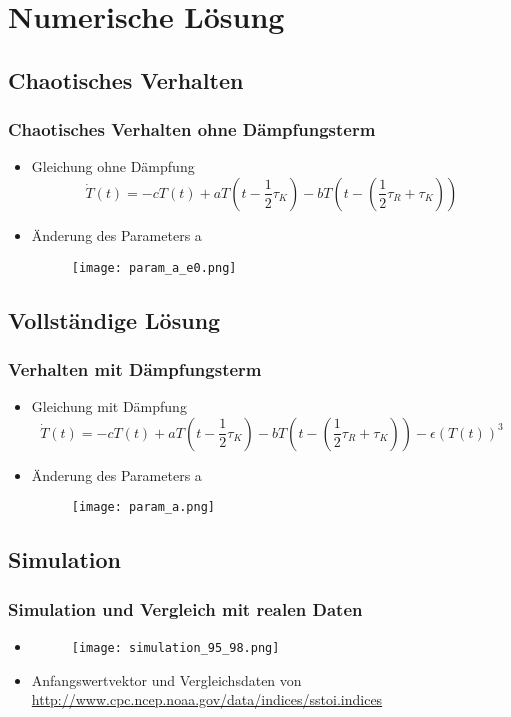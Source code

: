 \documentclass{beamer}
\begin{document}
\section{Numerische Lösung}

\subsection{Chaotisches Verhalten}
\begin{frame}
	\frametitle{Chaotisches Verhalten ohne Dämpfungsterm}
	\begin{itemize}
		\item[] Gleichung ohne Dämpfung
			\begin{equation}
				\dot{T}(t)=-cT(t)+aT(t-\frac{1}{2}\tau_K)-bT(t-(\frac{1}{2}\tau_R+\tau_K))
			\end{equation}
			\pause
		\item[] Änderung des Parameters a
			\begin{figure}
				\texttt{[image: param\_a\_e0.png]}
			\end{figure}
	\end{itemize}
\end{frame}

\subsection{Vollständige Lösung}
\begin{frame}
\frametitle{Verhalten mit Dämpfungsterm}
\begin{itemize}
	\item[] Gleichung mit Dämpfung
	\begin{equation}
	\dot{T}(t)=-cT(t)+aT(t-\frac{1}{2}\tau_K)-bT(t-(\frac{1}{2}\tau_R+\tau_K))-\epsilon(T(t))^3
	\end{equation}
	\pause
	\item[] Änderung des Parameters a
	\begin{figure}
		\texttt{[image: param\_a.png]}
	\end{figure}
\end{itemize}
\end{frame}

\subsection{Simulation}
\begin{frame}
\frametitle{Simulation und Vergleich mit realen Daten}
\begin{itemize}
	\item[] 
	\begin{figure}
		\texttt{[image: simulation\_95\_98.png]}
	\end{figure}
	\item[] Anfangswertvektor und Vergleichsdaten von \url{http://www.cpc.ncep.noaa.gov/data/indices/sstoi.indices}
\end{itemize}
\end{frame}
\end{document}
